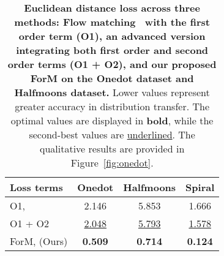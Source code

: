\begin{table}[!ht]
\begin{center}
\caption{ \textbf{Euclidean distance loss across three methods: Flow matching~\cite{lcb+22} with the first order term ({\textbf{O1}}), an advanced version integrating both first order and second order terms ({\textbf{O1 + O2}}), and our proposed ForM on the Onedot dataset and Halfmoons dataset.} Lower values represent greater accuracy in distribution transfer. The optimal values are displayed in \textbf{bold}, while the second-best values are \underline{underlined}. The qualitative results are provided in Figure~\ref{fig:onedot}. }
\label{tab:euclidean_distance_complex_datasets_new}
\begin{tabular}{|l|c|c|c|}
\hline
\textbf{Loss terms}  & \textbf{Onedot} & \textbf{Halfmoons} & \textbf{Spiral} \\
\hline
O1, \cite{lgl22}             & 2.146 & 5.853 & 1.666 \\
\hline
O1 + O2          & \underline{2.048} & \underline{5.793} & \underline{1.578} \\
\hline
ForM, (Ours)      & \textbf{0.509} & \textbf{0.714} & \textbf{0.124} \\
\hline
\end{tabular}
\end{center}
\end{table}


